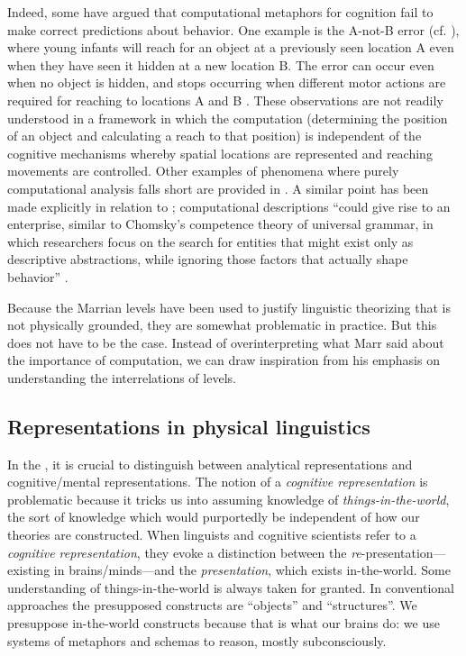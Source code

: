   Indeed, some have argued that computational metaphors for cognition fail to make correct predictions about behavior. One example is the A-not-B error (cf. \citealt{McClellandEtAl2010,SamuelsonEtAl2015}), where young infants will reach for an object at a previously seen location A even when they have seen it hidden at a new location B. The error can occur even when no object is hidden, and stops occurring when different motor actions are required for reaching to locations A and B \citep{SmithEtAl1999}. These observations are not readily understood in a framework in which the computation (determining the position of an object and calculating a reach to that position) is independent of the cognitive mechanisms whereby spatial locations are represented and reaching movements are controlled. Other examples of phenomena where purely computational analysis falls short are provided in \citet{SamuelsonEtAl2015}. A similar point has been made explicitly in relation to ; computational descriptions “could give rise to an enterprise, similar to Chomsky’s competence theory of universal grammar, in which researchers focus on the search for entities that might exist only as descriptive abstractions, while ignoring those factors that actually shape behavior” \citep{McClellandEtAl2010}.

  Because the Marrian levels have been used to justify linguistic theorizing that is not physically grounded, they are somewhat problematic in practice. But this does not have to be the case. Instead of overinterpreting what Marr said about the importance of computation, we can draw inspiration from his emphasis on understanding the interrelations of levels. 

\subsection{Representations in physical linguistics}

In the , it is crucial to distinguish between analytical representations and cognitive/mental representations. The notion of a \textit{cognitive representation} is problematic because it tricks us into assuming knowledge of \textit{things-in-the-world}, the sort of knowledge which would purportedly be independent of how our theories are constructed. When linguists and cognitive scientists refer to a \textit{cognitive representation}, they evoke a distinction between the \textit{re}{}-presentation—existing in brains/minds—and the \textit{presentation}, which exists in-the-world. Some understanding of things-in-the-world is always taken for granted. In conventional approaches the presupposed constructs are “objects” and “structures”. We presuppose in-the-world constructs because that is what our brains do: we use systems of metaphors and schemas to reason, mostly subconsciously. 

